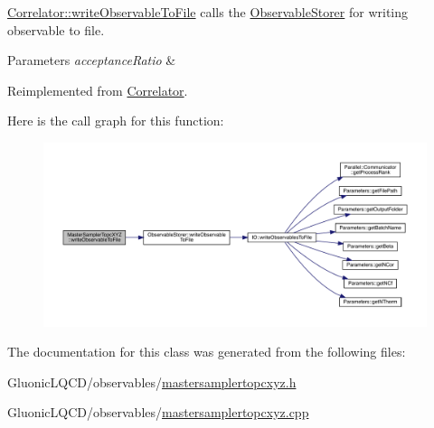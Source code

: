 \mbox{\hyperlink{class_correlator_a9e8d80e30e4fbe3b7fe57521538cb5ff}{Correlator\+::write\+Observable\+To\+File}} calls the \mbox{\hyperlink{class_observable_storer}{Observable\+Storer}} for writing observable to file. 


\begin{DoxyParams}{Parameters}
{\em acceptance\+Ratio} & \\
\hline
\end{DoxyParams}


Reimplemented from \mbox{\hyperlink{class_correlator_a9e8d80e30e4fbe3b7fe57521538cb5ff}{Correlator}}.

Here is the call graph for this function\+:
\nopagebreak
\begin{figure}[H]
\begin{center}
\leavevmode
\includegraphics[width=350pt]{class_master_sampler_topc_x_y_z_a930f13a2a13f4b3820f40c8b52110cf2_cgraph}
\end{center}
\end{figure}


The documentation for this class was generated from the following files\+:\begin{DoxyCompactItemize}
\item 
Gluonic\+L\+Q\+C\+D/observables/\mbox{\hyperlink{mastersamplertopcxyz_8h}{mastersamplertopcxyz.\+h}}\item 
Gluonic\+L\+Q\+C\+D/observables/\mbox{\hyperlink{mastersamplertopcxyz_8cpp}{mastersamplertopcxyz.\+cpp}}\end{DoxyCompactItemize}
